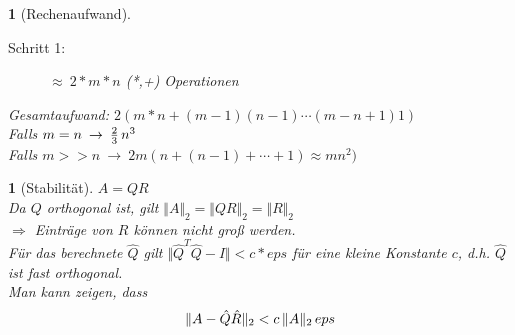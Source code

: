 \documentclass[12pt]{article}
\theoremstyle{break}
\newtheorem{nothing}[theorem]{}
\begin{document}
\begin{nothing}[Rechenaufwand] \leavevmode
\begin{description}
  \item[Schritt 1:] $\approx \medspace 2*m*n$ (*,+) Operationen
\end{description}
Gesamtaufwand: $2 (m*n + (m-1)(n-1) \cdots (m-n+1) 1 )$\\
Falls $m=n \medspace \rightarrow \medspace \frac{2}{3}\thinspace n^3$\\
Falls $m>>n \medspace \rightarrow \medspace 2m ( n + (n-1) + \cdots + 1 ) \approx mn^2)$
\end{nothing}

\begin{nothing}[Stabilität]
$A=QR$\\
Da $Q$ orthogonal ist, gilt $\Vert A \Vert_2 = \Vert QR \Vert_2 = \Vert R \Vert_2$\\
$\Rightarrow$ Einträge von $R$ können nicht groß werden. \\
Für das berechnete $\hat{Q}$ gilt $\Vert \hat{Q}^T \hat{Q} - I \Vert < c * eps$ für eine kleine Konstante $c$, d.h. $\hat{Q}$ ist fast orthogonal.\\
Man kann zeigen, dass 
$$\Vert A - \hat{Q} \hat{R} \Vert_2 < c\thinspace \Vert A \Vert_2 \thinspace eps$$
\end{nothing}
\end{document}
